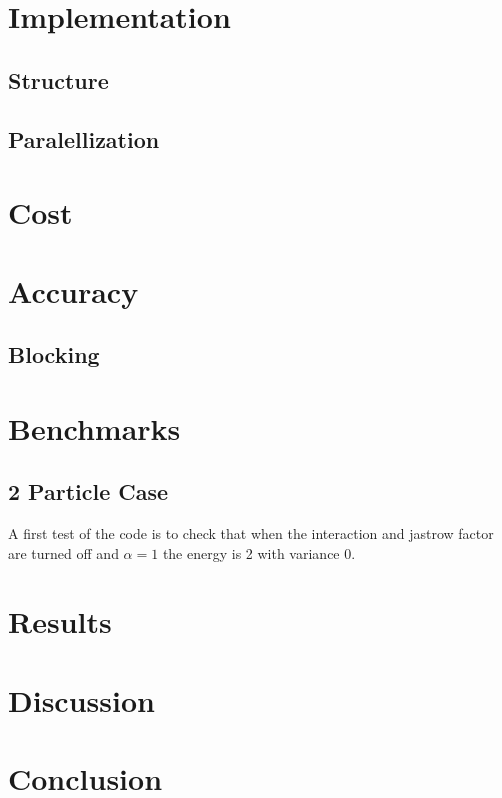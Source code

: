 \documentclass[a4paper,norsk,10pt]{article}
\begin{document}
\section{Implementation}

\subsection{Structure}
\subsection{Paralellization}

\section{Cost}

\section{Accuracy}

\subsection{Blocking}

\section{Benchmarks}

\subsection{2 Particle Case}
A first test of the code is to check that when the interaction and jastrow factor are turned off and $\alpha = 1$ the energy is 2 with variance 0.

\section{Results}

\section{Discussion}

\section{Conclusion}
\end{document}
